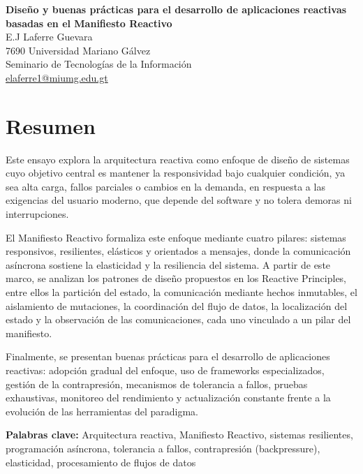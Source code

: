 \documentclass[12pt, letterpaper]{article}
\begin{document}
\RaggedRight%

\begin{center}
  {\bfseries\large Diseño y buenas prácticas para el desarrollo de aplicaciones reactivas basadas en el Manifiesto Reactivo
  } \\[0.5em]
  {\normalsize E.J Laferre Guevara} \\
  {\normalsize 7690 Universidad Mariano Gálvez} \\
  {\normalsize Seminario de Tecnologías de la Información} \\
  {\normalsize \href{mailto:elaferre1@miumg.edu.gt}{elaferre1@miumg.edu.gt}}
\end{center}

\section*{Resumen}
Este ensayo explora la arquitectura reactiva como enfoque de diseño de sistemas cuyo objetivo central es mantener la responsividad bajo cualquier condición, ya sea alta carga, fallos parciales o cambios en la demanda, en respuesta a las exigencias del usuario moderno, que depende del software y no tolera demoras ni interrupciones.

El Manifiesto Reactivo formaliza este enfoque mediante cuatro pilares: sistemas responsivos, resilientes, elásticos y orientados a mensajes, donde la comunicación asíncrona sostiene la elasticidad y la resiliencia del sistema. A partir de este marco, se analizan los patrones de diseño propuestos en los Reactive Principles, entre ellos la partición del estado, la comunicación mediante hechos inmutables, el aislamiento de mutaciones, la coordinación del flujo de datos, la localización del estado y la observación de las comunicaciones, cada uno vinculado a un pilar del manifiesto.

Finalmente, se presentan buenas prácticas para el desarrollo de aplicaciones reactivas: adopción gradual del enfoque, uso de frameworks especializados, gestión de la contrapresión, mecanismos de tolerancia a fallos, pruebas exhaustivas, monitoreo del rendimiento y actualización constante frente a la evolución de las herramientas del paradigma.

\noindent\textbf{Palabras clave:} Arquitectura reactiva, Manifiesto Reactivo, sistemas resilientes, programación asíncrona, tolerancia a fallos, contrapresión (backpressure), elasticidad, procesamiento de flujos de datos
\end{document}
